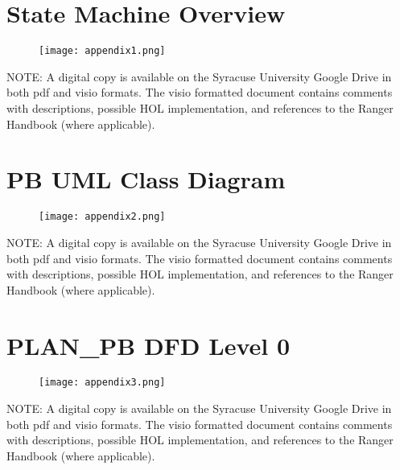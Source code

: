 \begin{landscape}
\chapter{State Machine Overview}
\label{cha:state-mach-overv}

\begin{figure}[h]
  \centering
  \texttt{[image: appendix1.png]}
\end{figure}
NOTE: A digital copy is available on the Syracuse University Google\textregistered
Drive in both pdf and visio formats. The visio formatted document contains
comments with descriptions, possible HOL implementation, and references
to the Ranger Handbook (where applicable).

\chapter{PB UML Class Diagram}
\label{cha:pb-uml-class}

\begin{figure}[h]
  \centering
  \texttt{[image: appendix2.png]}
\end{figure}
NOTE: A digital copy is available on the Syracuse University Google\textregistered
Drive in both pdf and visio formats. The visio formatted document contains
comments with descriptions, possible HOL implementation, and references
to the Ranger Handbook (where applicable).



\chapter{PLAN_PB DFD Level 0}
\label{cha:planpb-dfd-level-2}

\begin{figure}[h]
  \centering
  \texttt{[image: appendix3.png]}
\end{figure}
NOTE: A digital copy is available on the Syracuse University Google\textregistered
Drive in both pdf and visio formats. The visio formatted document contains
comments with descriptions, possible HOL implementation, and references
to the Ranger Handbook (where applicable).
\end{landscape}


